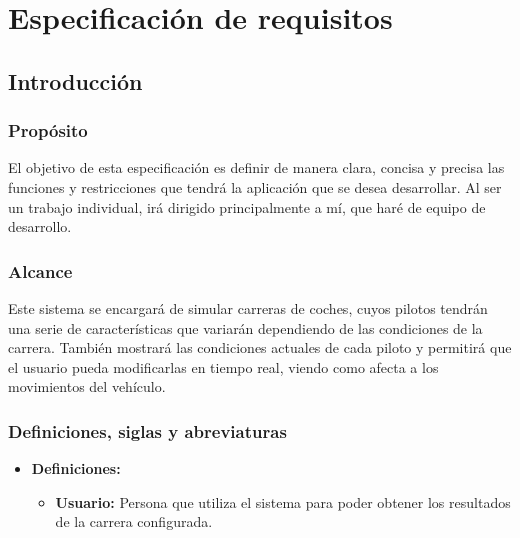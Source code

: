 \chapter{Especificación de requisitos}

\section{Introducción}

\subsection{Propósito}
El objetivo de esta especificación es definir de manera clara, concisa y precisa las funciones y restricciones que tendrá la aplicación que se desea desarrollar. Al ser un trabajo individual, irá dirigido principalmente a mí, que haré de equipo de desarrollo.

\subsection{Alcance}


Este sistema se encargará de simular carreras de coches, cuyos pilotos tendrán una serie de características que variarán dependiendo de las condiciones de la carrera. También mostrará las condiciones actuales de cada piloto y permitirá que el usuario pueda modificarlas en tiempo real, viendo como afecta a los movimientos del vehículo.

\subsection{Definiciones, siglas y abreviaturas}

\begin{itemize}
    \item \textbf{Definiciones: }
        \begin{itemize}
            \item \textbf{Usuario: }Persona que utiliza el sistema para poder obtener los resultados de la carrera configurada.
        \end{itemize}
\end{itemize}


